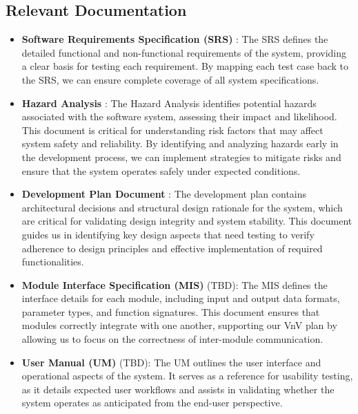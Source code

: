 \documentclass[12pt, titlepage]{article}
\begin{document}
\subsection{Relevant Documentation}

\begin{itemize}
    \item \textbf{Software Requirements Specification (SRS)} \citep{SRS}: The SRS defines the detailed functional and non-functional requirements of the system, providing a clear basis for testing each requirement. By mapping each test case back to the SRS, we can ensure complete coverage of all system specifications.

    \item \textbf{Hazard Analysis} \citep{Hazard-Analysis}: The Hazard Analysis identifies potential hazards associated with the software system, assessing their impact and likelihood. This document is critical for understanding risk factors that may affect system safety and reliability. By identifying and analyzing hazards early in the development process, we can implement strategies to mitigate risks and ensure that the system operates safely under expected conditions.

    \item \textbf{Development Plan Document} \citep{Development-Plan}: The development plan contains architectural decisions and structural design rationale for the system, which are critical for validating design integrity and system stability. This document guides us in identifying key design aspects that need testing to verify adherence to design principles and effective implementation of required functionalities.

    \item \textbf{Module Interface Specification (MIS)} (TBD): The MIS defines the interface details for each module, including input and output data formats, parameter types, and function signatures. This document ensures that modules correctly integrate with one another, supporting our VnV plan by allowing us to focus on the correctness of inter-module communication.

    \item \textbf{User Manual (UM)} (TBD): The UM outlines the user interface and operational aspects of the system. It serves as a reference for usability testing, as it details expected user workflows and assists in validating whether the system operates as anticipated from the end-user perspective.
\end{itemize}
\end{document}
